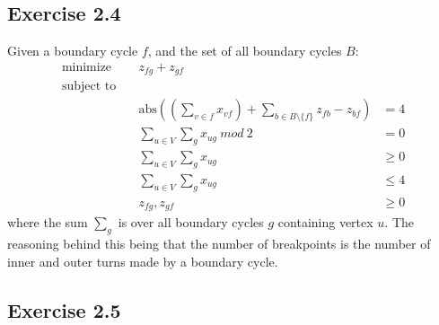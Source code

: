 \subsection{Exercise 2.4}
%
Given a boundary cycle $f$, and the set of all boundary cycles $B$:
\begin{align*}
  \text{minimize} \quad & z_{fg} + z_{gf} &  \\
  \text{subject to} \quad & & \\
  & \text{abs}\left(\left( \sum_{v\in f} x_{vf} \right) + 
    \sum_{b\in B \setminus \{f\}} z_{fb} - z_{bf}\right) & = 4 \\
  & \sum_{u\in V} \sum_{g} x_{ug} \ \textit{mod} \ 2 & = 0 \\
  & \sum_{u\in V} \sum_{g} x_{ug} & \geq 0 \\
  & \sum_{u\in V} \sum_{g} x_{ug} & \leq 4 \\
  & z_{fg}, z_{gf} & \geq 0
\end{align*} 
%
where the sum $\sum_{g}$ is over all boundary cycles $g$ containing vertex $u$. The reasoning
behind this being that the number of breakpoints is the number of inner and
outer turns made by a boundary cycle.
%
\subsection{Exercise 2.5}
